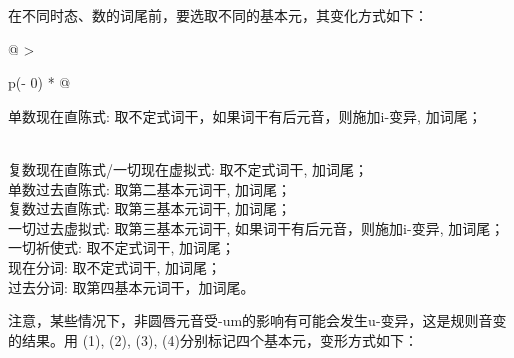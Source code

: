 在不同时态、数的词尾前，要选取不同的基本元，其变化方式如下：

\begin{longtable}[]{@{}
  >{\raggedright\arraybackslash}p{(\columnwidth - 0\tabcolsep) * }@{}}
\toprule\noalign{}
\begin{minipage}[b]{\linewidth}\raggedright
单数现在直陈式: 取不定式词干，如果词干有后元音，则施加i-变异, 加词尾；
\end{minipage} \\
\midrule\noalign{}
\endhead
\bottomrule\noalign{}
\endlastfoot
复数现在直陈式/一切现在虚拟式: 取不定式词干, 加词尾； \\
单数过去直陈式: 取第二基本元词干, 加词尾； \\
复数过去直陈式: 取第三基本元词干, 加词尾； \\
一切过去虚拟式: 取第三基本元词干, 如果词干有后元音，则施加i-变异,
加词尾； \\
一切祈使式: 取不定式词干, 加词尾； \\
现在分词: 取不定式词干, 加词尾； \\
过去分词: 取第四基本元词干，加词尾。 \\
\end{longtable}

注意，某些情况下，非圆唇元音受-um的影响有可能会发生u-变异，这是规则音变的结果。用
(1), (2), (3), (4)分别标记四个基本元，变形方式如下：

